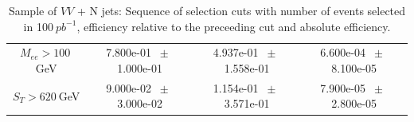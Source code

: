 \begin{table}[htbp]
\begin{center}
\begin{tabular}{|c|c|c|c|}
          $M_{ee}>100~$GeV          &           7.800e-01          $~\pm~$          1.000e-01           &           4.937e-01          $~\pm~$          1.558e-01           &           6.600e-04          $~\pm~$          8.100e-05          \\          
          $ S_T>620~$GeV           &           9.000e-02          $~\pm~$          3.000e-02           &           1.154e-01          $~\pm~$          3.571e-01           &           7.900e-05          $~\pm~$          2.800e-05          \\          
          \hline\hline 
\end{tabular} 
\end{center} 
\caption{Sample of $VV$ + N jets: Sequence of selection cuts with number of events selected in 100$~pb^{-1}$, efficiency relative to the preceeding cut and absolute efficiency.} 
\label{tab:effic-VV} 
\end{table} 

